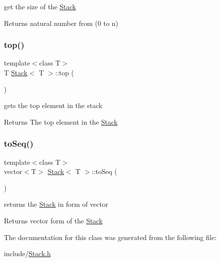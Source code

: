 get the size of the \mbox{\hyperlink{class_stack}{Stack}} 

\begin{DoxyReturn}{Returns}
natural number from (0 to n) 
\end{DoxyReturn}
\mbox{\label{class_stack_ad461f6de40c8672dbf743068f4515061}} 
\subsubsection{\texorpdfstring{top()}{top()}}
{\footnotesize\ttfamily template$<$class T$>$ \\
T \mbox{\hyperlink{class_stack}{Stack}}$<$ T $>$\+::top (\begin{DoxyParamCaption}{ }\end{DoxyParamCaption})}



gets the top element in the stack 

\begin{DoxyReturn}{Returns}
The top element in the \mbox{\hyperlink{class_stack}{Stack}} 
\end{DoxyReturn}
\mbox{\label{class_stack_a91a9cfa054ebcd9725b1520810ecc607}} 
\subsubsection{\texorpdfstring{toSeq()}{toSeq()}}
{\footnotesize\ttfamily template$<$class T$>$ \\
vector$<$T$>$ \mbox{\hyperlink{class_stack}{Stack}}$<$ T $>$\+::to\+Seq (\begin{DoxyParamCaption}{ }\end{DoxyParamCaption})}



returns the \mbox{\hyperlink{class_stack}{Stack}} in form of vector 

\begin{DoxyReturn}{Returns}
vector form of the \mbox{\hyperlink{class_stack}{Stack}} 
\end{DoxyReturn}


The documentation for this class was generated from the following file\+:\begin{DoxyCompactItemize}
\item 
include/\mbox{\hyperlink{_stack_8h}{Stack.\+h}}\end{DoxyCompactItemize}
